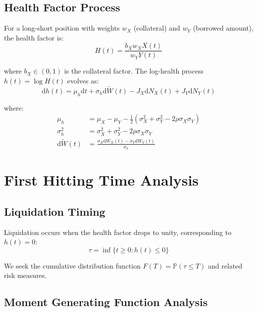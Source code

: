 \documentclass{article}
\renewcommand{\P}{\mathbb{P}}
\newcommand{\diff}{\mathrm{d}}
\theoremstyle{definition}
\begin{document}
\subsection{Health Factor Process}

For a long-short position with weights $w_X$ (collateral) and $w_Y$ (borrowed amount), the health factor is:
\begin{equation}
H(t) = \frac{b_X w_X X(t)}{w_Y Y(t)} \label{eq:health_factor}
\end{equation}

where $b_X \in (0,1)$ is the collateral factor. The log-health process $h(t) = \log H(t)$ evolves as:
\begin{equation}
\diff h(t) = \mu_h \diff t + \sigma_h \diff \tilde{W}(t) - J_X \diff N_X(t) + J_Y \diff N_Y(t) \label{eq:log_health_dynamics}
\end{equation}

where:
\begin{align}
\mu_h &= \mu_X - \mu_Y - \frac{1}{2}(\sigma_X^2 + \sigma_Y^2 - 2\rho\sigma_X\sigma_Y) \\
\sigma_h^2 &= \sigma_X^2 + \sigma_Y^2 - 2\rho\sigma_X\sigma_Y \\
\diff \tilde{W}(t) &= \frac{\sigma_X \diff W_X(t) - \sigma_Y \diff W_Y(t)}{\sigma_h}
\end{align}

\section{First Hitting Time Analysis}

\subsection{Liquidation Timing}

Liquidation occurs when the health factor drops to unity, corresponding to $h(t) = 0$:
\begin{equation}
\tau = \inf\{t \geq 0 : h(t) \leq 0\} \label{eq:stopping_time}
\end{equation}

We seek the cumulative distribution function $F(T) = \P(\tau \leq T)$ and related risk measures.

\subsection{Moment Generating Function Analysis}
\end{document}
